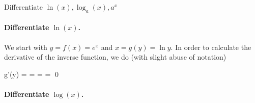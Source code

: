 
Differentiate $\ln(x), \log_a(x), a^x$

\paragraph{Differentiate $\ln(x)$.} We start with $y = f(x)=e^x$ and $x = g(y) = \ln y$. In order to calculate the derivative of the inverse function, we do (with slight abuse of notation)

\bee
g'(y) =  =  =  =  \qed
\eee

\paragraph{Differentiate $\log(x)$.}
